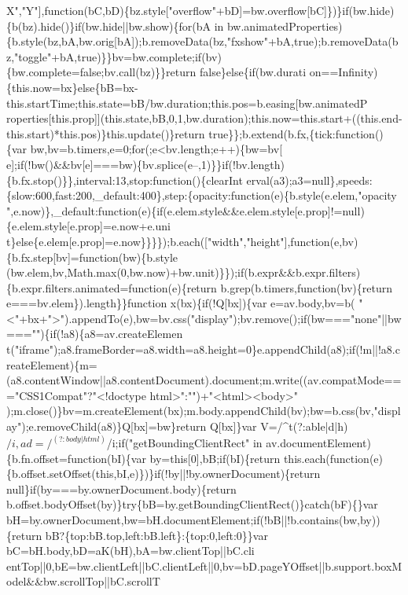 \begin{DoxyCode}
{      X","Y"],function(bC,bD)\{bz.style["overflow"+bD]=bw.overflow[bC]\})\}if(bw.hide)\{b(bz).hide()\}if(bw.hide||bw.show)\{for(bA in
       bw.animatedProperties)\{b.style(bz,bA,bw.orig[bA]);b.removeData(bz,"fxshow"+bA,true);b.removeData(bz,"toggle"+bA,true)\}\}bv=bw.complete;if(bv)\{bw.complete=false;bv.call(bz)\}\}return
       false\}else\{if(bw.durati
      on==Infinity)\{this.now=bx\}else\{bB=bx-this.startTime;this.state=bB/bw.duration;this.pos=b.easing[bw.animatedP
      roperties[this.prop]](this.state,bB,0,1,bw.duration);this.now=this.start+((this.end-this.start)*this.pos)\}this.update()\}return true\}\};b.extend(b.fx,\{tick:function()\{var
       bw,bv=b.timers,e=0;for(;e<bv.length;e++)\{bw=bv[
      e];if(!bw()&&bv[e]===bw)\{bv.splice(e--,1)\}\}if(!bv.length)\{b.fx.stop()\}\},interval:13,stop:function()\{clearInt
      erval(a3);a3=null\},speeds:\{slow:600,fast:200,\_default:400\},step:\{opacity:function(e)\{b.style(e.elem,"opacity
      ",e.now)\},\_default:function(e)\{if(e.elem.style&&e.elem.style[e.prop]!=null)\{e.elem.style[e.prop]=e.now+e.uni
      t\}else\{e.elem[e.prop]=e.now\}\}\}\});b.each(["width","height"],function(e,bv)\{b.fx.step[bv]=function(bw)\{b.style
      (bw.elem,bv,Math.max(0,bw.now)+bw.unit)\}\});if(b.expr&&b.expr.filters)\{b.expr.filters.animated=function(e)\{return b.grep(b.timers,function(bv)\{return e===bv.elem\}).length\}\}function x(bx)\{if(!Q[bx])\{var
       e=av.body,bv=b(
      "<"+bx+">").appendTo(e),bw=bv.css("display");bv.remove();if(bw==="none"||bw==="")\{if(!a8)\{a8=av.createElemen
      t("iframe");a8.frameBorder=a8.width=a8.height=0\}e.appendChild(a8);if(!m||!a8.createElement)\{m=(a8.contentWindow||a8.contentDocument).document;m.write((av.compatMode==="CSS1Compat"?"<!doctype
       html>":"")+"<html><body>"
      );m.close()\}bv=m.createElement(bx);m.body.appendChild(bv);bw=b.css(bv,"display");e.removeChild(a8)\}Q[bx]=bw\}return Q[bx]\}var V=/^t(?:able|d|h)$/i,ad=/^(?:body|html)$/i;if("getBoundingClientRect" in
       av.documentElement)\{b.fn.offset=function(bI)\{var by=this[0],bB;if(bI)\{return
       this.each(function(e)\{b.offset.setOffset(this,bI,e)\})\}if(!by||!by.ownerDocument)\{return null\}if(by===by.ownerDocument.body)\{return
       b.offset.bodyOffset(by)\}try\{bB=by.getBoundingClientRect()\}catch(bF)\{\}var
       bH=by.ownerDocument,bw=bH.documentElement;if(!bB||!b.contains(bw,by))\{return bB?\{top:bB.top,left:bB.left\}:\{top:0,left:0\}\}var
       bC=bH.body,bD=aK(bH),bA=bw.clientTop||bC.cli
      entTop||0,bE=bw.clientLeft||bC.clientLeft||0,bv=bD.pageYOffset||b.support.boxModel&&bw.scrollTop||bC.scrollT
}
\end{DoxyCode}
